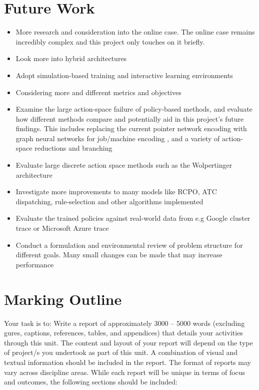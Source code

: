 \documentclass[12pt]{article}
\begin{document}
\section{Future Work}
\begin{itemize}
    \item More research and consideration into the online case. The online case remains incredibly complex and this project only touches on it briefly.
    \item Look more into hybrid architectures \cite{ml_ra_litrev2025}
    \item Adopt simulation-based training and interactive learning environments \cite{ml_ra_litrev2025}
    \item Considering more and different metrics and objectives
    \item Examine the large action-space failure of policy-based methods, and evaluate how different methods compare and potentially aid in this project's future findings. This includes replacing the current pointer network encoding with graph neural networks for job/machine encoding \cite{gnn2024jsspsurvey}, and a variety of action-space reductions and branching \cite{tavakoli2018actionbranching}
    \item Evaluate large discrete action space methods such as the Wolpertinger architecture \cite{dulacarnold2015largeactionspaces}
    \item Investigate more improvements to many models like RCPO, ATC dispatching, rule-selection and other algorithms implemented
    \item Evaluate the trained policies against real-world data from e.g Google cluster trace or Microsoft Azure trace
    \item Conduct a formulation and environmental review of problem structure for different goals. Many small changes can be made that may increase performance
\end{itemize}



\newpage
\section{Marking Outline}
Your task is to:
\newline
Write a report of approximately 3000 – 5000 words (excluding gures, captions, references, tables, and appendices) that details your activities through this unit. The content and layout of your report will depend on the type of project/s you undertook as part of this unit. A combination of visual and textual information should be included in the report. The format of reports may vary across discipline areas. While each report will be unique in terms of focus and outcomes, the following sections should be included:
\end{document}

